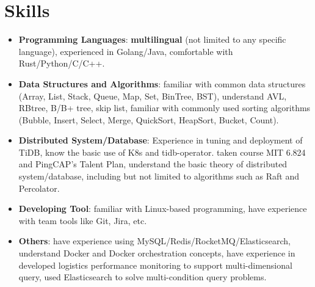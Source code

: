 \documentclass{resume}
\newcommand{\en}[1]{#1}
\newcommand{\zh}[1]{}
\begin{document}
\section{\en{Skills}\zh{技能}}
\begin{itemize}[parsep=0.25ex]
       \item \en{\textbf{Programming Languages}:
                        \textbf{multilingual} (not limited to any specific language), 
                  	experienced in Golang/Java,
                  	comfortable with Rust/Python/C/C++.}
            \zh{\textbf{编程语言}:
                 \textbf{泛语言}（编程不受特定语言限制），
                  熟悉 Golang/Java，
               了解 Rust/Python/C/C++ 等}
                           
       \item \en{\textbf{Data Structures and Algorithms}:
                        familiar with common data structures (Array, List, Stack, Queue, Map, Set, BinTree, BST), 
                        understand AVL, RBtree, B/B+ tree, skip list, familiar with commonly used sorting algorithms (Bubble, Insert, Select, Merge, QuickSort, HeapSort, Bucket, Count).}
                \zh{\textbf{数据结构与算法}:
                		{熟悉常用数据结构}（Array、List、Stack、Queue、Map、Set、BinTree、BST），
		       了解AVL、RBtree、B/B+树、跳表；
                          熟悉常用的排序算法（冒泡、插入、选择、归并、快排、堆排、桶、计数）。}

      \item \en{\textbf{Distributed System/Database}:
                  Experience in tuning and deployment of TiDB, know the basic use of K8s and tidb-operator.
                  taken course MIT 6.824 and PingCAP's Talent Plan,
                  understand the basic theory of distributed system/database,
                  including but not limited to algorithms such as Raft and Percolator.}
              \zh{\textbf{分布式系统/数据库}:
                  有分布式数据库 TiDB 的调优开发以及部署经验，了解 K8s 以及 tidb-operator 的基本使用。
                  自主学习了 MIT 6.824 和 PingCAP's Talent Plan 等课程，
                  了解分布式系统/数据库的基本理论，包括但不限于 Raft 和 Percolator 等算法}
                  
      \item \en{\textbf{Developing Tool}:
                  familiar with Linux-based programming,
                  have experience with team tools like Git, Jira, etc.}
            \zh{\textbf{开发工具}:
                  熟悉 Linux，有 Git、Jira 等团队协作工具的使用经验}
   
     \item \en{\textbf{Others}:
                  have experience using MySQL/Redis/RocketMQ/Elasticsearch, 
                  understand Docker and Docker orchestration concepts, 
                  have experience in developed logistics performance monitoring to support multi-dimensional query, 
                  used Elasticsearch to solve multi-condition query problems.}
          \zh{\textbf{其它}:	 	 
                  有 MySQL/Redis/RocketMQ/Elasticsearch 使用经验，了解容器及容器编排相关概念，
               开发过物流履约监控支持多维度查询，使用 Elasticsearch 解决多条件查询问题。}
\end{itemize}
\end{document}
